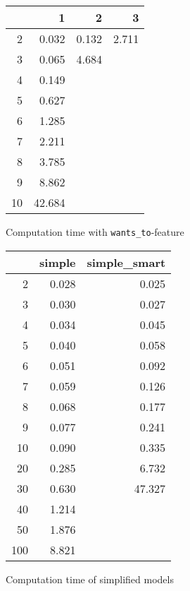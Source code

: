 \documentclass[a4paper,10pt]{article}
\begin{document}
	\begin{figure}[H]
		\begin{center}
			\begin{tabular}{r|r|r|r}
				\backslashbox{$F$}{$n$} & 1 & 2 & 3 \\ \hline
				2	& 0.032		& 0.132		& 2.711		\\ \hline
				3	& 0.065		& 4.684		&			\\ \hline
				4	& 0.149		&			&			\\ \hline
				5	& 0.627		&			&			\\ \hline
				6	& 1.285		&			&			\\ \hline 
				7	& 2.211		&			&			\\ \hline
				8	& 3.785		&			&			\\ \hline
				9	& 8.862		&			&			\\ \hline
				10	& 42.684	&			&			\\ \hline
			\end{tabular}
		\end{center}
		
		\caption{Computation time with \texttt{wants\_to}-feature}
	\end{figure}
	
	\begin{figure}[H]
		\begin{center}
			\begin{tabular}{r|r|r}
				\backslashbox{$F$}{$n$} & simple & simple\_smart \\ \hline
				2	& 0.028		& 0.025		\\ \hline
				3	& 0.030		& 0.027		\\ \hline
				4	& 0.034		& 0.045		\\ \hline
				5	& 0.040		& 0.058		\\ \hline
				6	& 0.051		& 0.092		\\ \hline 
				7	& 0.059		& 0.126		\\ \hline
				8	& 0.068		& 0.177		\\ \hline
				9	& 0.077		& 0.241		\\ \hline
				10	& 0.090		& 0.335		\\ \hline
				20	& 0.285		& 6.732		\\ \hline
				30	& 0.630		& 47.327	\\ \hline
				40	& 1.214		&		\\ \hline
				50	& 1.876		&		\\ \hline
				100	& 8.821		&		\\ \hline
			\end{tabular}
		\end{center}
		
		\caption{Computation time of simplified models}
	\end{figure}
	
\end{document}
